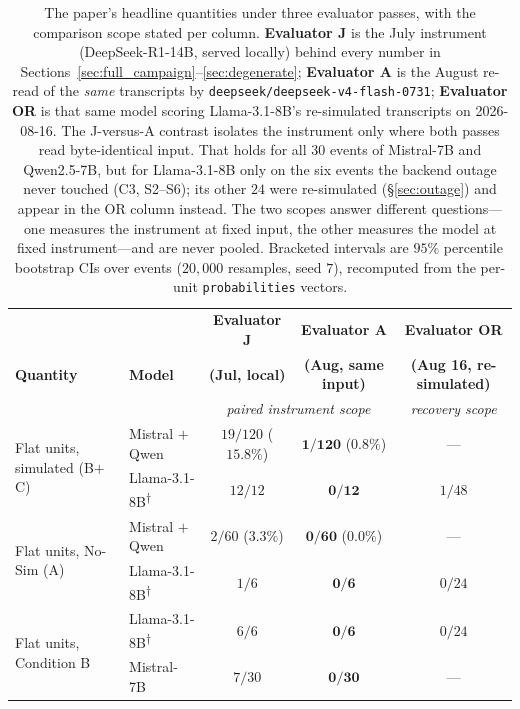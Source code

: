 \documentclass[11pt,journal,onecolumn]{IEEEtran}
\begin{document}
\begin{table}[!htbp]
\centering
\caption{The paper's headline quantities under three evaluator passes, with the comparison scope stated per column. \textbf{Evaluator J} is the July instrument (DeepSeek-R1-14B, served locally) behind every number in Sections~\ref{sec:full_campaign}--\ref{sec:degenerate}; \textbf{Evaluator A} is the August re-read of the \emph{same} transcripts by \texttt{deepseek/deepseek-v4-flash-0731}; \textbf{Evaluator OR} is that same model scoring Llama-3.1-8B's re-simulated transcripts on 2026-08-16. The J-versus-A contrast isolates the instrument only where both passes read byte-identical input. That holds for all $30$ events of Mistral-7B and Qwen2.5-7B, but for Llama-3.1-8B only on the six events the backend outage never touched (C3, S2--S6); its other $24$ were re-simulated (\S\ref{sec:outage}) and appear in the OR column instead. The two scopes answer different questions---one measures the instrument at fixed input, the other measures the model at fixed instrument---and are never pooled. Bracketed intervals are $95\%$ percentile bootstrap CIs over events ($20{,}000$ resamples, seed $7$), recomputed from the per-unit \texttt{probabilities} vectors.}
\label{tab:replication}
\scriptsize
\setlength{\tabcolsep}{2.5pt}
\begin{tabular}{llccc}
\toprule
 & & \textbf{Evaluator J} & \textbf{Evaluator A} & \textbf{Evaluator OR} \\
\textbf{Quantity} & \textbf{Model} & \textbf{(Jul, local)} & \textbf{(Aug, same input)} & \textbf{(Aug 16, re-simulated)} \\
 & & \multicolumn{2}{c}{\emph{paired instrument scope}} & \emph{recovery scope} \\
\midrule
\multirow{2}{*}{Flat units, simulated (B$+$C)} & Mistral $+$ Qwen & $19/120$ ($15.8\%$) & $\mathbf{1/120}$ ($0.8\%$) & --- \\
 & Llama-3.1-8B\textsuperscript{$\dagger$} & $12/12$ & $\mathbf{0/12}$ & $1/48$ \\
\multirow{2}{*}{Flat units, No-Sim (A)} & Mistral $+$ Qwen & $2/60$ ($3.3\%$) & $\mathbf{0/60}$ ($0.0\%$) & --- \\
 & Llama-3.1-8B\textsuperscript{$\dagger$} & $1/6$ & $\mathbf{0/6}$ & $0/24$ \\
\midrule
\multirow{3}{*}{Flat units, Condition B} & Llama-3.1-8B\textsuperscript{$\dagger$} & $6/6$ & $\mathbf{0/6}$ & $0/24$ \\
 & Mistral-7B & $7/30$ & $\mathbf{0/30}$ & --- \\

\end{tabular}
\end{table}
\end{document}

